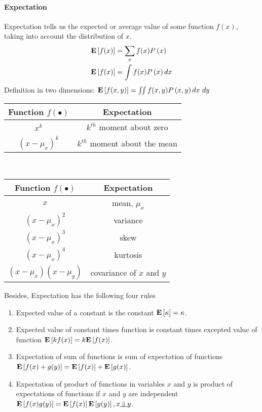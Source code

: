 \paragraph{Expectation}

Expectation tells us the expected or average value of some function $f(x)$, taking into account the distribution of $x$.
\begin{align*}
	\mathbf{E}\left[f(x)\right]&=\sum_x f(x)P\left(x\right) \\
	\mathbf{E}\left[f(x)\right]&=\int f(x)P\left(x\right)dx
\end{align*}
Definition in two dimensions: $\mathbf{E}\left[f(x,y)\right]=\iint f(x,y)P\left(x,y\right)dx\ dy$
\begin{table*}[!h]
	\centering
	\begin{tabular}{|c|c|}
		\hline
		Function $f(\bullet)$ & Expectation \\
		\hline\hline
		$x^k$ & $k^{th}$ moment about zero \\
		\hline
		$(x-\mu_x)^k$ & $k^{th}$ moment about the mean \\
		\hline
	\end{tabular}
	\
	\begin{tabular}{|c|c|}
		\hline
		Function $f(\bullet)$ & Expectation \\
		\hline\hline
		$x$ & mean, $\mu_x$ \\
		\hline
		$(x-\mu_x)^2$ & variance \\
		\hline
		$(x-\mu_x)^3$ & skew \\
		\hline
		$(x-\mu_x)^4$ & kurtosis \\
		\hline
		$(x-\mu_x)(x-\mu_y)$ & covariance of $x$ and $y$ \\
		\hline
	\end{tabular}
\end{table*}

Besides, Expectation has the following four rules
	\begin{enumerate}
		\item Expected value of a constant is the constant $\mathbf{E}\left[\kappa\right]=\kappa$.
		\item Expected value of constant times function is constant times excepted value of function $\mathbf{E}\left[kf(x)\right]=k\mathbf{E}\left[f(x)\right]$.
		\item Expectation of sum of functions is sum of expectation of functions \\ $\mathbf{E}\left[f(x)+g(y)\right]=\mathbf{E}\left[f(x)\right]+\mathbf{E}\left[g(x)\right]$.
		\item Expectation of product of functions in variables $x$ and $y$ is product of expectations of functions if $x$ and $y$ are independent $\E{f(x)g(y)}=\E{f(x)}\E{g(y)}, x \indep y$.
	\end{enumerate}

